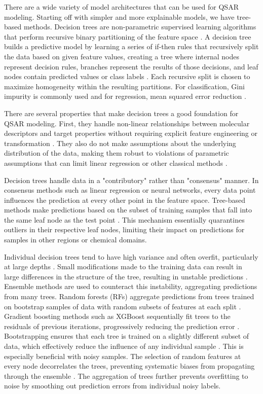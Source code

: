 There are a wide variety of model architectures that can be used for QSAR modeling. Starting off with simpler and more explainable models, we have tree-based methods. Decision trees are non-parametric supervised learning algorithms that perform recursive binary partitioning of the feature space \citep{Breiman1984}. A decision tree builds a predictive model by learning a series of if-then rules that recursively split the data based on given feature values, creating a tree  where internal nodes represent decision rules, branches represent the results of those decisions, and leaf nodes contain predicted values or class labels \citep{Breiman1984}. Each recursive split is chosen to maximize  homogeneity within the resulting partitions. For classification, Gini impurity is commonly used and for regression, mean squared error reduction \citep{Breiman1984}.

There are several properties that make decision trees a good foundation for QSAR modeling. First, they handle non-linear relationships between molecular descriptors and target properties without requiring explicit feature engineering or transformation \citep{Breiman1984}. They also do not make assumptions about the underlying distribution of the data, making them robust to violations of parametric assumptions that can limit linear regression or other classical methods \citep{Svetnik2003}. 

Decision trees handle data in a "contributory" rather than "consensus" manner. In consensus methods such as linear regression or neural networks, every data point influences the prediction at every other point in the feature space. Tree-based methods make predictions based on the subset of training samples that fall into the same leaf node as the test point \citep{Breiman1984}. This mechanism essentially quarantines outliers in their respective leaf nodes, limiting their impact on predictions for samples in other regions or chemical domains. 

Individual decision trees tend to have high variance and often overfit, particularly at large depths \citep{Breiman1984}. Small modifications made to the training data can result in large differences in the structure of the tree, resulting in unstable predictions \citep{Breiman2001}. Ensemble methods are used to counteract this instability, aggregating predictions from many trees. Random forests (RFs) aggregate predictions from trees trained on bootstrap samples of data with random subsets of features at each split \citep{Breiman2001}. Gradient boosting methods such as XGBoost sequentially fit trees to the residuals of previous iterations, progressively reducing the prediction error \citep{Chen2016}. Bootstrapping ensures that each tree is trained on a slightly different subset of data, which effectively reduce the influence of any individual sample \citep{Breiman2001}. This is especially beneficial with noisy samples. The selection of random features at every node decorrelates the trees, preventing systematic biases from propagating through the ensemble \citep{Breiman2001}. The aggregation of trees further prevents overfitting to noise by smoothing out prediction errors from individual noisy labels. 

